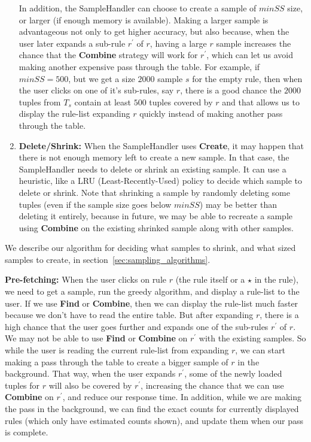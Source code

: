 \documentclass{sig-alternate}
\begin{document}
\begin{enumerate}
In addition, the SampleHandler can choose to create a sample of $minSS$ size, or larger (if enough memory is available). Making a larger sample is advantageous not only to get higher accuracy, but also because, when the user later expands a sub-rule $r^{\prime}$ of $r$, having a large $r$ sample increases the chance that the \textbf{Combine} strategy will work for $r^{\prime}$, which can let us avoid making another expensive pass through the table. For example, if $minSS = 500$, but we get a size $2000$ sample $s$ for the empty rule, then when the user clicks on one of it's sub-rules, say $r$, there is a good chance the $2000$ tuples from $T_s$ contain at least $500$ tuples covered by $r$ and that allows us to display the rule-list expanding $r$ quickly instead of making another pass through the table. 

\item \textbf{Delete/Shrink:} When the SampleHandler uses \textbf{Create}, it may happen that there is not enough memory left to create a new sample. In that case, the SampleHandler needs to delete or shrink an existing sample. It can use a heuristic, like a LRU (Least-Recently-Used) policy to decide which sample to delete or shrink. Note that shrinking a sample by randomly deleting some tuples (even if the sample size goes below $minSS$) may be better than deleting it entirely, because in future, we may be able to recreate a sample using \textbf{Combine} on the existing shrinked sample along with other samples.
\end{enumerate}

We describe our algorithm for deciding what samples to shrink, and what sized samples to create, in section~\ref{sec:sampling_algorithms}. 

\textbf{Pre-fetching:} When the user clicks on rule $r$ (the rule itself or a $\star$ in the rule), we need to get a sample, run the greedy algorithm, and display a rule-list to the user. If we use \textbf{Find} or \textbf{Combine}, then we can display the rule-list much faster because we don't have to read the entire table. But after expanding $r$, there is a high chance that the user goes further and expands one of the sub-rules $r^{\prime}$ of $r$. We may not be able to use \textbf{Find} or \textbf{Combine} on $r^{\prime}$ with the existing samples. So while the user is reading the current rule-list from expanding $r$, we can start making a pass through the table to create a bigger sample of $r$ in the background. That way, when the user expands $r^{\prime}$, some of the newly loaded tuples for $r$ will also be covered by $r^{\prime}$, increasing the chance that we can use \textbf{Combine} on $r^{\prime}$, and reduce our response time. 
In addition, while we are making the pass in the background, we can find the exact counts for currently displayed rules (which only have estimated counts shown), and update them when our pass is complete.
\end{document}
